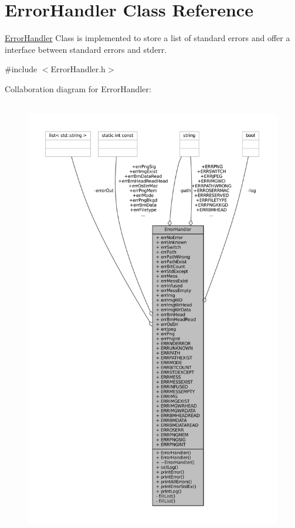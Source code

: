 \hypertarget{classErrorHandler}{}\section{Error\+Handler Class Reference}
\label{classErrorHandler}


\mbox{\hyperlink{classErrorHandler}{Error\+Handler}} Class is implemented to store a list of standard errors and offer a interface between standard errors and stderr.  




{\ttfamily \#include $<$Error\+Handler.\+h$>$}



Collaboration diagram for Error\+Handler\+:\nopagebreak
\begin{figure}[H]
\begin{center}
\leavevmode
\includegraphics[height=550pt]{classErrorHandler__coll__graph}
\end{center}
\end{figure}
